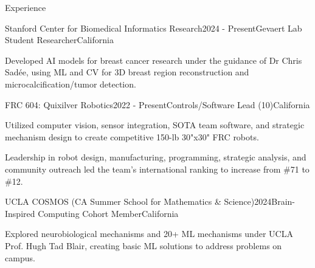 \documentclass[
  11pt, %
]{resume}
\begin{document}
\sloppy


\begin{rSection}{Experience}


  \begin{rSubsection}{Stanford Center for Biomedical Informatics Research}{2024 - Present}{Gevaert Lab Student Researcher}{California}
    
    \item Developed AI models for breast cancer research under the guidance of Dr Chris Sadée, using ML and CV for 3D breast region reconstruction and microcalcification/tumor detection.
    
  \end{rSubsection}
        
  \begin{rSubsection}{FRC 604: Quixilver Robotics}{2022 - Present}{Controls/Software Lead (10)}{California}
    
    \item Utilized computer vision, sensor integration, SOTA team software, and strategic mechanism design to create competitive 150-lb 30"x30" FRC robots.
    
    \item Leadership in robot design, manufacturing, programming, strategic analysis, and community outreach led the team's international ranking to increase from \#71 to \#12.
    
  \end{rSubsection}
        
  \begin{rSubsection}{UCLA COSMOS (CA Summer School for Mathematics \& Science)}{2024}{Brain-Inspired Computing Cohort Member}{California}
    
    \item Explored neurobiological mechanisms and 20+ ML mechanisms under UCLA Prof. Hugh Tad Blair, creating basic ML solutions to address problems on campus.
    
  \end{rSubsection}
        
	
\end{rSection}

\end{document}
